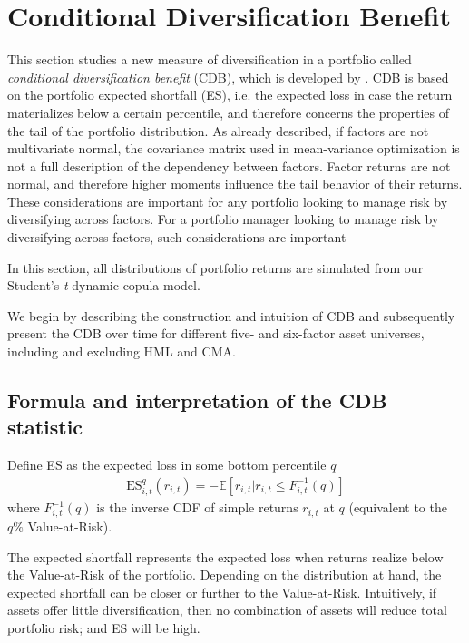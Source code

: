 
\section{Conditional Diversification Benefit} %
\label{sec:conditional_diversification_benefit}

This section studies a new measure of diversification in a portfolio called \emph{conditional diversification benefit} (CDB), which is developed by \textcite{ChristoffersenErrunzaJacobLanglois2012}. CDB is based on the portfolio expected shortfall (ES), i.e. the expected loss in case the return materializes below a certain percentile, and therefore concerns the properties of the tail of the portfolio distribution. As already described, if factors are not multivariate normal, the covariance matrix used in mean-variance optimization is not a full description of the dependency between factors. Factor returns are not normal, and therefore higher moments influence the tail behavior of their returns. These considerations are important for any portfolio looking to manage risk by diversifying across factors.
For a portfolio manager looking to manage risk by diversifying across factors, such considerations are important

In this section, all distributions of portfolio returns are simulated from our Student's \textit{t} dynamic copula model.

We begin by describing the construction and intuition of CDB and subsequently present the CDB over time for different five- and six-factor asset universes, including and excluding HML and CMA.

\subsection{Formula and interpretation of the CDB statistic}

Define ES as the expected loss in some bottom percentile $q$
\begin{align}
    \text{ES}_{i,t}^q(r_{i,t}) = -\mathbb{E}[r_{i,t} | r_{i,t} \leq F_{i,t}^{-1}(q)]
\end{align}
where $F_{i,t}^{-1}(q)$ is the inverse CDF of simple returns $r_{i,t}$ at $q$ (equivalent to the $q\%$ Value-at-Risk). 

The expected shortfall represents the expected loss when returns realize below the Value-at-Risk of the portfolio. Depending on the distribution at hand, the expected shortfall can be closer or further to the Value-at-Risk. Intuitively, if assets offer little diversification, then no combination of assets will reduce total portfolio risk; and ES will be high. 

